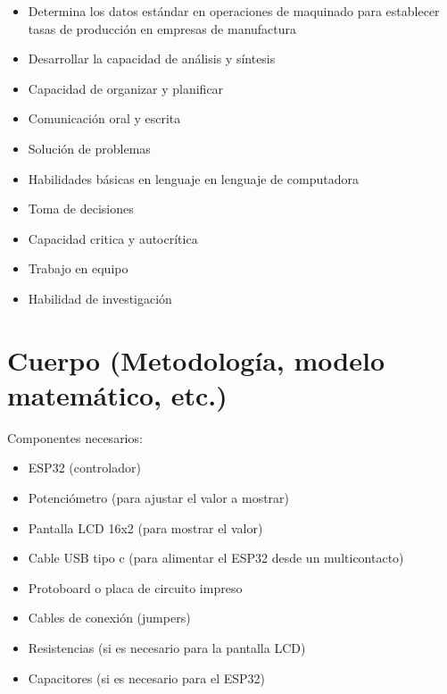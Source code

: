     \begin{itemize}
        \item Determina los datos estándar en operaciones de maquinado para establecer tasas de producción en empresas de manufactura
        \item Desarrollar la capacidad de análisis y síntesis
        \item Capacidad de organizar y planificar
        \item Comunicación oral y escrita 
        \item Solución de problemas 
        \item Habilidades básicas en lenguaje en lenguaje de computadora
        \item Toma de decisiones 
        \item Capacidad critica y autocrítica 
        \item Trabajo en equipo 
        \item Habilidad de investigación 
        
        
    \end{itemize}
    
    \section{Cuerpo (Metodología, modelo matemático, etc.)}
    
    
    
       
     Componentes necesarios: 
    \begin{itemize}
    
    \item ESP32 (controlador)
    \item Potenciómetro (para ajustar el valor a mostrar)
    \item Pantalla LCD 16x2 (para mostrar el valor)
    \item Cable USB tipo c (para alimentar el ESP32 desde un multicontacto)
    \item Protoboard o placa de circuito impreso
    \item Cables de conexión (jumpers)
    \item Resistencias (si es necesario para la pantalla LCD)
    \item Capacitores (si es necesario para el ESP32)
    
    \end{itemize}
    
